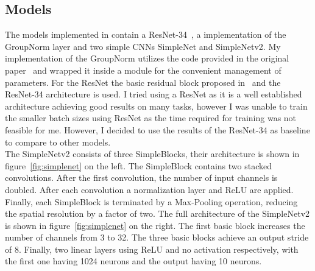 \subsection{Models}\label{subsec:models}
The models implemented in  contain a ResNet-34~\cite{he2015deep}, a implementation of the GroupNorm layer and two simple CNNs SimpleNet and SimpleNetv2.
My implementation of the GroupNorm utilizes the code provided in the original paper~\cite{DBLP:journals/corr/abs-1803-08494} and wrapped it inside a module for the convenient management of parameters.
For the ResNet the basic residual block proposed in~\cite{he2015deep} and the ResNet-34 architecture is used.
I tried using a ResNet as it is a well established architecture achieving good results on many tasks, however I was unable to train the smaller batch sizes using ResNet as the time required for training was not feasible for me.
However, I decided to use the results of the ResNet-34 as baseline to compare to other models.\\
The SimpleNetv2 consists of three SimpleBlocks, their architecture is shown in figure~\ref{fig:simplenet} on the left.
The SimpleBlock contains two stacked convolutions.
After the first convolution, the number of input channels is doubled.
After each convolution a normalization layer and ReLU are applied.
Finally, each SimpleBlock is terminated by a Max-Pooling operation, reducing the spatial resolution by a factor of two.
The full architecture of the SimpleNetv2 is shown in figure~\ref{fig:simplenet} on the right.
The first basic block increases the number of channels from 3 to 32.
The three basic blocks achieve an output stride of 8.
Finally, two linear layers using ReLU and no activation respectively, with the first one having 1024 neurons and the output having 10 neurons.
